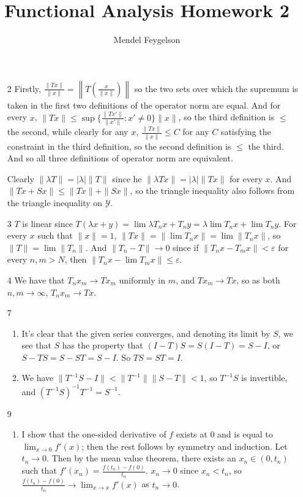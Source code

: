 \documentclass{article}
\title{Functional Analysis Homework 2}
\author{Mendel Feygelson}
\newcommand\Y{\mathcal Y}
\begin{document}
\maketitle
\begin{enumerate}

   \item[2] Firstly, $\frac{\|Tx\|}{\|x\|} =
      \left\|T\left(\frac{x}{\|x\|}\right)\right\|$ so the two sets over which
      the supremum is taken in the first two definitions of the operator norm
      are equal. And for every $x$, $\|Tx\| \leq \sup\{\frac{\|Tx'\|}{\|x'\|} :
      x' \neq 0 \}\|x\|$, so the third definition is $\leq$ the second, while
      clearly for any $x$, $\frac{\|Tx\|}{\|x\|} \leq C$ for any $C$ satisfying
      the constraint in the third definition, so the second definition is $\leq$
      the third. And so all three definitions of operator norm are equivalent.

      Clearly $\|\lambda T\| = |\lambda|\|T\|$ since he $\|\lambda Tx\| =
      |\lambda|\|Tx\|$ for every $x$. And $\|Tx + Sx\| \leq \|Tx\| + \|Sx\|$, so
      the triangle inequality also follows from the triangle inequality on $\Y$.

   \item[3] $T$ is linear since $T(\lambda x+y) = \lim \lambda T_nx+T_ny =
      \lambda \lim T_nx + \lim T_ny$. For every $x$ such that $\|x\|=1$, $\|Tx\|
      = \|\lim T_nx\| = \lim \|T_nx\|$, so $\|T\| = \lim \|T_n\|$. And
      $\|T_n-T\| \to 0$ since if $\|T_nx-T_mx\| < \varepsilon$ for every
      $n,m>N$, then $\|T_nx - \lim T_mx\| \leq \varepsilon$.

   \item[4] We have that $T_nx_m \to Tx_m$ uniformly in $m$, and $Tx_m \to Tx$,
      so as both $n,m \to \infty$, $T_nx_m \to Tx$.
      
   \item[7] \begin{enumerate}
         \item It's clear that the given series converges, and denoting its
            limit by $S$, we see that $S$ has the property that $(I-T)S = S(I-T)
            = S - I$, or $S - TS = S - ST = S-I$. So $TS = ST = I$.

         \item We have $\|T^{-1}S - I\| < \|T^{-1}\|\|S-T\| < 1$, so $T^{-1}S$
            is invertible, and $(T^{-1}S)^{-1}T^{-1} = S^{-1}$.
      \end{enumerate}

   \item[9] \begin{enumerate}
         \item I show that the one-sided derivative of $f$ exists at 0 and is
            equal to $\lim_{x \to 0} f'(x)$; then the rest follows by symmetry
            and induction. Let $t_n \to 0$. Then by the mean value theorem,
            there exists an $x_n \in (0,t_n)$ such that $f'(x_n) =
            \frac{f(t_n)-f(0)}{t_n}$. $x_n \to 0$ since $x_n < t_n$, so
            $\frac{f(t_n)-f(0)}{t_n} \to \lim_{x \to x} f'(x)$ as $t_n \to 0$.


\end{enumerate}
\end{enumerate}
\end{document}
